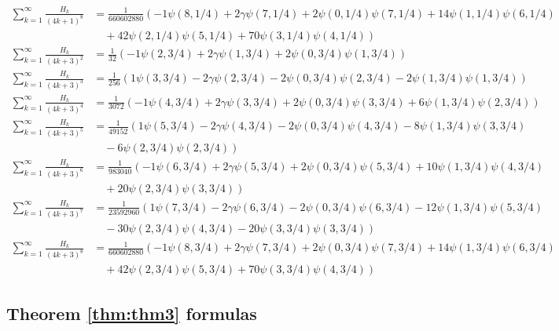 \documentclass{article}
\theoremstyle{definition}
\begin{document}
\begin{align}
\sum_{k=1}^\infty \frac{H_k}{(4k+1)^8} &= \frac{ 1}{660602880}\left( -1\psi(8,1/4) +2\gamma\psi(7,1/4) +2\psi(0,1/4)\psi(7,1/4) +14\psi(1,1/4)\psi(6,1/4)  \right. \nonumber \\ &\left. \hspace{1em}
+42\psi(2,1/4)\psi(5,1/4) +70\psi(3,1/4)\psi(4,1/4)\right) \\
\sum_{k=1}^\infty \frac{H_k}{(4k+3)^2} &= \frac{1}{32}\left( -1\psi(2,3/4) +2\gamma\psi(1,3/4) +2\psi(0,3/4)\psi(1,3/4)\right) \\
\sum_{k=1}^\infty \frac{H_k}{(4k+3)^3} &= \frac{1}{256}\left(  1\psi(3,3/4) -2\gamma\psi(2,3/4) -2\psi(0,3/4)\psi(2,3/4) -2\psi(1,3/4)\psi(1,3/4)\right) \\
\sum_{k=1}^\infty \frac{H_k}{(4k+3)^4} &= \frac{ 1}{3072}\left( -1\psi(4,3/4) +2\gamma\psi(3,3/4) +2\psi(0,3/4)\psi(3,3/4) +6\psi(1,3/4)\psi(2,3/4)\right) \\
\sum_{k=1}^\infty \frac{H_k}{(4k+3)^5} &= \frac{1}{49152}\left(  1\psi(5,3/4) -2\gamma\psi(4,3/4) -2\psi(0,3/4)\psi(4,3/4) -8\psi(1,3/4)\psi(3,3/4)  \right. \nonumber \\ &\left. \hspace{1em}
-6\psi(2,3/4)\psi(2,3/4)\right) \\
\sum_{k=1}^\infty \frac{H_k}{(4k+3)^6} &= \frac{ 1}{983040}\left( -1\psi(6,3/4) +2\gamma\psi(5,3/4) +2\psi(0,3/4)\psi(5,3/4) +10\psi(1,3/4)\psi(4,3/4)  \right. \nonumber \\ &\left. \hspace{1em}
+20\psi(2,3/4)\psi(3,3/4)\right) \\
\sum_{k=1}^\infty \frac{H_k}{(4k+3)^7} &= \frac{1}{23592960}\left(  1\psi(7,3/4) -2\gamma\psi(6,3/4) -2\psi(0,3/4)\psi(6,3/4) -12\psi(1,3/4)\psi(5,3/4)  \right. \nonumber \\ &\left. \hspace{1em}
-30\psi(2,3/4)\psi(4,3/4) -20\psi(3,3/4)\psi(3,3/4)\right) \\
\sum_{k=1}^\infty \frac{H_k}{(4k+3)^8} &= \frac{ 1}{660602880}\left( -1\psi(8,3/4) +2\gamma\psi(7,3/4) +2\psi(0,3/4)\psi(7,3/4) +14\psi(1,3/4)\psi(6,3/4)  \right. \nonumber \\ &\left. \hspace{1em}
+42\psi(2,3/4)\psi(5,3/4) +70\psi(3,3/4)\psi(4,3/4)\right)
\end{align}

\subsection{Theorem \ref{thm:thm3} formulas} \label{sec:catcor2}
\end{document}
